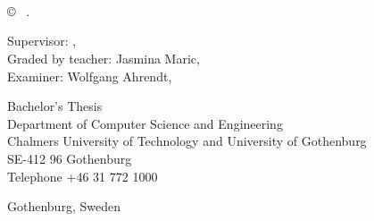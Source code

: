 \begin{small}
\newpage
\thispagestyle{plain}
\vspace*{4.5cm}
\oneLineTitle\\
\oneLineSubtitle\\
\MARTINT{} \setlength{\parskip}{1cm}
\FELIXT{} \setlength{\parskip}{1cm}
\HANNEST{} \setlength{\parskip}{1cm}
\\
\MARCUST{} \setlength{\parskip}{1cm}
\JAKOBT{} \setlength{\parskip}{1cm}

\copyright ~ \MEMBERTILDELIST{} \the\year. \setlength{\parskip}{1cm}


Supervisor: \supervisor, \department\\
Graded by teacher: Jasmina Maric, \department\\
Examiner: Wolfgang Ahrendt, \department
\setlength{\parskip}{1cm}


Bachelor's Thesis \the\year\\	%
Department of Computer Science and Engineering\\
Chalmers University of Technology and University of Gothenburg\\
SE-412 96 Gothenburg\\
Telephone +46 31 772 1000 \setlength{\parskip}{0.5cm}

\vfill


Gothenburg, Sweden \the\year

\end{small}